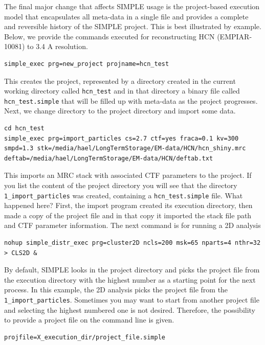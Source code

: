 \documentclass[a4paper,11pt]{article}
\begin{document}
The final major change that affects SIMPLE usage is the project-based execution model that encapsulates all meta-data in a single file and provides a complete and reversible history of the SIMPLE project. This is best illustrated by example. Below, we provide the commands executed for reconstructing HCN (EMPIAR-10081) to 3.4 A resolution.

\begin{Verbatim}[commandchars=+\[\],fontsize=\small,breaklines=true]
simple_exec prg=new_project projname=hcn_test
\end{Verbatim}

\noindent{}This creates the project, represented by a directory created in the current working directory called \texttt{hcn\_test} and in that directory a binary file called \texttt{hcn\_test.simple} that will be filled up with meta-data as the project progresses. Next, we change directory to the project directory and import some data.

\begin{Verbatim}[commandchars=+\[\],fontsize=\small,breaklines=true]
cd hcn_test
simple_exec prg=import_particles cs=2.7 ctf=yes fraca=0.1 kv=300 smpd=1.3 stk=/media/hael/LongTermStorage/EM-data/HCN/hcn_shiny.mrc deftab=/media/hael/LongTermStorage/EM-data/HCN/deftab.txt
\end{Verbatim}

\noindent{}This imports an MRC stack with associated CTF parameters to the project. If you list the content of the project directory you will see that the directory \texttt{1\_import\_particles} was created, containing a \texttt{hcn\_test.simple} file. What happened here? First, the import program created its execution directory, then made a copy of the project file and in that copy it imported the stack file path and CTF parameter information. The next command is for running a 2D analysis

\begin{Verbatim}[commandchars=+\[\],fontsize=\small,breaklines=true]
nohup simple_distr_exec prg=cluster2D ncls=200 msk=65 nparts=4 nthr=32 > CLS2D &
\end{Verbatim}

\noindent{}By default, SIMPLE looks in the project directory and picks the project file from the execution directory with the highest number as a starting point for the next process. In this example, the 2D analysis picks the project file from the \texttt{1\_import\_particles}. Sometimes you may want to start from another project file and selecting the highest numbered one is not desired. Therefore, the possibility to provide a project file on the command line is given.
\begin{Verbatim}[commandchars=+\[\],fontsize=\small,breaklines=true]
projfile=X_execution_dir/project_file.simple
\end{Verbatim}
\end{document}

